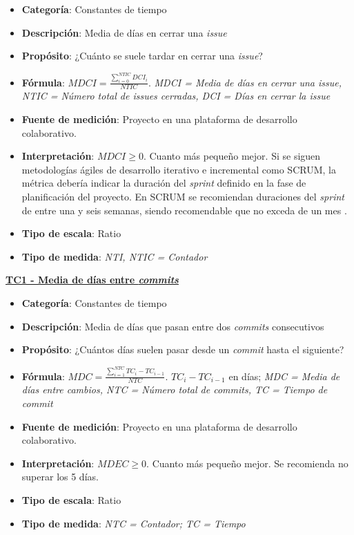 \begin{itemize}
	\item \textbf{Categoría}: Constantes de tiempo
	\item \textbf{Descripción}:  Media de días en cerrar una \textit{issue}
	\item \textbf{Propósito}: ¿Cuánto se suele tardar en cerrar una \textit{issue}? 
	\item \textbf{Fórmula}: $MDCI = \frac{\sum_{i=0}^{NTIC}DCI_i}{NTIC}$. \textit{MDCI = Media de días en cerrar una \textit{issue}, NTIC = Número total de \textit{issues} cerradas, DCI = Días en cerrar la \textit{issue}}
	\item \textbf{Fuente de medición}: Proyecto en una plataforma de desarrollo colaborativo.
	\item \textbf{Interpretación}: $MDCI \geq 0$. Cuanto más pequeño mejor. Si se siguen metodologías ágiles de desarrollo iterativo e incremental como SCRUM, la métrica debería indicar la duración del \textit{sprint} definido en la fase de planificación del proyecto. En SCRUM se recomiendan duraciones del \textit{sprint} de entre una y seis semanas, siendo recomendable que no exceda de un mes \cite{scrum_master_scrum_2019}.
	\item \textbf{Tipo de escala}: Ratio
	\item \textbf{Tipo de medida}: \textit{NTI, NTIC = Contador}
\end{itemize}

\textbf{\underline{TC1 - Media de días entre \textit{commits}}}

\begin{itemize}
	\item \textbf{Categoría}: Constantes de tiempo
	\item \textbf{Descripción}: Media de días que pasan entre dos \textit{commits} consecutivos
	\item \textbf{Propósito}: ¿Cuántos días suelen pasar desde un \textit{commit} hasta el siguiente?
	\item \textbf{Fórmula}: $MDC = \frac{\sum_{i=1}^{NTC} TC_i - TC_{i-1}}{NTC}$. $TC_i - TC_{i-1}$ en días; \textit{MDC = Media de días entre cambios, NTC = Número total de \textit{commits}, TC = Tiempo de \textit{commit}}
	\item \textbf{Fuente de medición}: Proyecto en una plataforma de desarrollo colaborativo.
	\item \textbf{Interpretación}: $MDEC \geq 0$. Cuanto más pequeño mejor. Se recomienda no superar los 5 días.
	\item \textbf{Tipo de escala}: Ratio
	\item \textbf{Tipo de medida}: \textit{NTC = Contador; TC = Tiempo}
\end{itemize}

